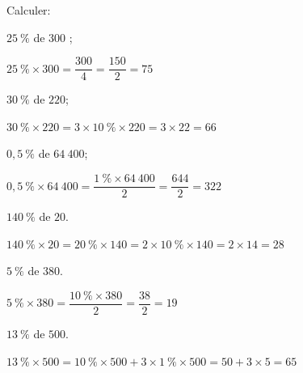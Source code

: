 \documentclass[11pt,a4paper]{article}  %
\begin{document}
Calculer:
	\begin{enumMet}
		\item $25\ \%$ de $300$ ;
		\begin{corrBox}
			$25\ \%\times 300=\dfrac{300}{4}=\dfrac{150}{2}=75$		
		\end{corrBox}
		\item {} $30\ \%$ de $220$;
		\begin{corrBox}
			$30\ \%\times 220=3\times 10\ \% \times 220=3\times 22=66$		
		\end{corrBox}
		\item $0,5\ \%$ de $64\ 400$;
		\begin{corrBox}
			$0,5\ \%\times 64\ 400=\dfrac{1\ \%\times 64\ 400}{2}=\dfrac{644}{2}=322$
		\end{corrBox}
		\item $140\ \%$ de $20$.
			\begin{corrBox}
			$140\ \%\times 20=20\ \%\times 140= 2\times 10\ \%\times 140=2\times 14=28$
		\end{corrBox}
		\item $5\ \%$ de $380$.
		\begin{corrBox}
			$5\ \%\times 380=\dfrac{10\ \%\times 380}{2}=\dfrac{38}{2}=19$
		\end{corrBox}
		\item $13\ \%$ de $500$.
		\begin{corrBox}
			$13\ \%\times 500=10\ \%\times 500+3\times 1\ \%\times 500=50+3\times 5=65$
		\end{corrBox}
	\end{enumMet}
\end{document}
